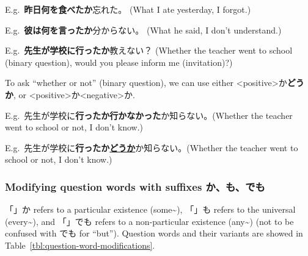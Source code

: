 \documentclass[../nihongo-gakushuu-kyouzai.tex]{subfiles}
\begin{document}
E.g.\ \textbf{昨日何を食べたか}忘れた。 (What I ate yesterday, I forgot.)

E.g.\ \textbf{彼は何を言ったか}分からない。 (What he said, I don't understand.)

E.g.\ \textbf{先生が学校に行ったか}教えない？ (Whether the teacher went to school (binary question), would you please inform me (invitation)?)

To ask ``whether or not'' (binary question), we can use either <positive>か\textbf{どうか}, or <positive>か<negative>か.

E.g.\ 先生が学校に\textbf{行ったか行かなかった}か知らない。(Whether the teacher went to school or not, I don't know.)

E.g.\ 先生が学校に\textbf{行ったか\ul{どうか}}か知らない。(Whether the teacher went to school or not, I don't know.)


\subsubsection{Modifying question words with suffixes か、も、でも}
「」か refers to a particular existence (some\textasciitilde), 「」も refers to the universal (every\textasciitilde), and 「」でも refers to a non-particular existence (any\textasciitilde) (not to be confused with でも for ``but''). Question words and their variants are showed in Table~\ref{tbl:question-word-modifications}.

\begin{table}[h]
\centering
{}
\caption{Question words and their modified variants. Treat these all as normal nouns. $^\dagger$: 誰も is usually used in negative sentences to mean nobody can do the verb, and to express the positive universal everybody we typically use [さん]; $^\ddagger$: 何も is used exclusively in negative sentences.}
\label{tbl:question-word-modifications}
\end{table}
\end{document}
